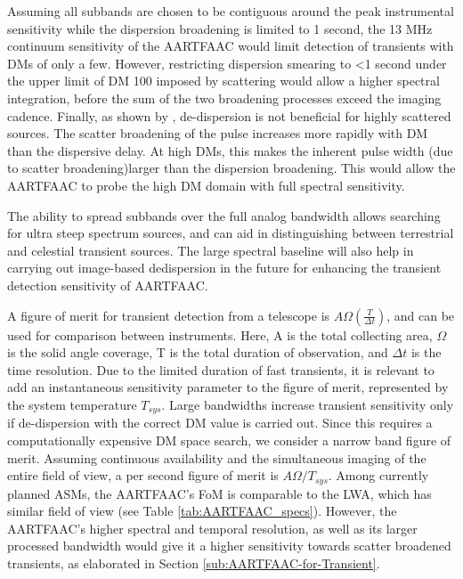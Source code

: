 \documentclass{aa}
\begin{document}
Assuming all subbands  are chosen to be contiguous  around the peak instrumental
sensitivity while the  dispersion broadening is limited to 1  second, the 13 MHz
continuum sensitivity of  the AARTFAAC would limit detection  of transients with
DMs of only a few.  However, restricting dispersion smearing to \mbox{<1} second
under  the upper limit  of DM  100 imposed  by scattering  would allow  a higher
spectral integration, before the sum  of the two broadening processes exceed the
imaging   cadence.   Finally,    as   shown   by   \citet{hassall2013detecting},
de-dispersion  is  not beneficial  for  highly  scattered  sources. The  scatter
broadening  of the  pulse increases  more rapidly  with DM  than  the dispersive
delay.   At high  DMs,  this makes  the  inherent pulse  width  (due to  scatter
broadening)larger than the dispersion  broadening. This would allow the AARTFAAC
to probe the high DM domain with full spectral sensitivity.

The ability to  spread subbands over the full  analog bandwidth allows searching
for  ultra  steep  spectrum  sources,  and can  aid  in  distinguishing  between
terrestrial and  celestial transient sources.  The large  spectral baseline will
also help in  carrying out image-based dedispersion in  the future for enhancing
the transient detection sensitivity of AARTFAAC.

A  figure of  merit  for transient  detection  \citep{cordes2004dynamic} from  a
telescope  is  $A\Omega\left(\frac{T}{\Delta t}\right)$,  and  can  be used  for
comparison between instruments.  Here, A  is the total collecting area, $\Omega$
is the solid angle coverage, T is the total duration of observation, and $\Delta
t$ is the time resolution. Due to the limited duration of fast transients, it is
relevant to add  an instantaneous sensitivity parameter to  the figure of merit,
represented  by the  system  temperature $T_{sys}$.   Large bandwidths  increase
transient sensitivity only if de-dispersion with the correct DM value is carried
out.  Since  this requires  a  computationally  expensive  DM space  search,  we
consider a narrow band figure of merit. Assuming continuous availability and the
simultaneous imaging of  the entire field of view, a per  second figure of merit
is  $A\Omega/T_{sys}$.  Among  currently  planned ASMs,  the  AARTFAAC's FoM  is
comparable  to   the  LWA,   which  has  similar   field  of  view   (see  Table
\ref{tab:AARTFAAC_specs}). However, the  AARTFAAC's higher spectral and temporal
resolution, as  well as its  larger processed bandwidth  would give it  a higher
sensitivity  towards  scatter broadened  transients,  as  elaborated in  Section
\ref{sub:AARTFAAC-for-Transient}.
\end{document}
